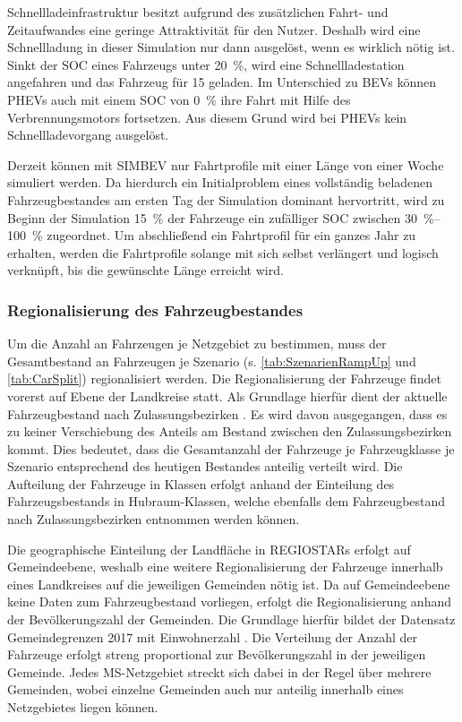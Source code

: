 

Schnellladeinfrastruktur besitzt aufgrund des zusätzlichen Fahrt- und Zeitaufwandes eine geringe Attraktivität für den Nutzer.
Deshalb wird eine Schnellladung in dieser Simulation nur dann ausgelöst, wenn es wirklich nötig ist.
Sinkt der \gls{SOC} eines Fahrzeugs unter \SI{20}{\percent}, wird eine Schnellladestation angefahren und das Fahrzeug für \SI{15}{\Minuten} geladen.
Im Unterschied zu \glspl{BEV} können \glspl{PHEV} auch mit einem \gls{SOC} von \SI{0}{\percent} ihre Fahrt mit Hilfe des Verbrennungsmotors fortsetzen.
Aus diesem Grund wird bei \glspl{PHEV} kein Schnellladevorgang ausgelöst.\medskip

Derzeit können mit \gls{SIMBEV} nur Fahrtprofile mit einer Länge von einer Woche simuliert werden.
Da hierdurch ein Initialproblem eines vollständig beladenen Fahrzeugbestandes am ersten Tag der Simulation dominant hervortritt, wird zu Beginn der Simulation \SI{15}{\percent} der Fahrzeuge ein zufälliger \gls{SOC} zwischen \SIrange[range-phrase=~bis~]{30}{100}{\percent} zugeordnet.
Um abschließend ein Fahrtprofil für ein ganzes Jahr zu erhalten, werden die Fahrtprofile solange mit sich selbst verlängert und logisch verknüpft, bis die gewünschte Länge erreicht wird.


\subsubsection{Regionalisierung des Fahrzeugbestandes}

Um die Anzahl an Fahrzeugen je Netzgebiet zu bestimmen, muss der Gesamtbestand an Fahrzeugen je Szenario (s. \autoref{tab:SzenarienRampUp} und \autoref{tab:CarSplit}) regionalisiert werden.
Die Regionalisierung der Fahrzeuge findet vorerst auf Ebene der Landkreise statt.
Als Grundlage hierfür dient der aktuelle Fahrzeugbestand nach Zulassungsbezirken \cite[][Stand: ]{KBAPLZ2020}.
Es wird davon ausgegangen, dass es zu keiner Verschiebung des Anteils am Bestand zwischen den Zulassungsbezirken kommt.
Dies bedeutet, dass die Gesamtanzahl der Fahrzeuge je Fahrzeugklasse je Szenario entsprechend des heutigen Bestandes anteilig verteilt wird.
Die Aufteilung der Fahrzeuge in Klassen erfolgt anhand der Einteilung des Fahrzeugsbestands in Hubraum-Klassen, welche ebenfalls dem Fahrzeugbestand nach Zulassungsbezirken entnommen werden können.\medskip

Die geographische Einteilung der Landfläche in \glspl{REGIOSTAR} erfolgt auf Gemeindeebene, weshalb eine weitere Regionalisierung der Fahrzeuge innerhalb eines Landkreises auf die jeweiligen Gemeinden nötig ist.
Da auf Gemeindeebene keine Daten zum Fahrzeugbestand vorliegen, erfolgt die Regionalisierung anhand der Bevölkerungszahl der Gemeinden.
Die Grundlage hierfür bildet der Datensatz \glqq Gemeindegrenzen 2017 mit Einwohnerzahl\grqq{} \cite[][Stand: ]{EDG2020}.
Die Verteilung der Anzahl der Fahrzeuge erfolgt streng proportional zur Bevölkerungszahl in der jeweiligen Gemeinde.
Jedes \gls{MS}-Netzgebiet streckt sich dabei in der Regel über mehrere Gemeinden, wobei einzelne Gemeinden auch nur anteilig innerhalb eines Netzgebietes liegen können.\medskip

